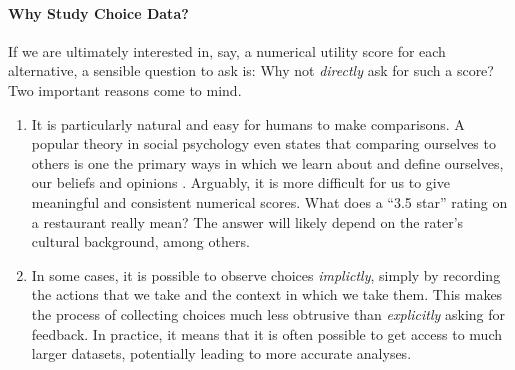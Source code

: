 \paragraph{Why Study Choice Data?}
If we are ultimately interested in, say, a numerical utility score for each alternative, a sensible question to ask is:
Why not \emph{directly} ask for such a score?
Two important reasons come to mind.
\begin{enumerate}
\item It is particularly natural and easy for humans to make comparisons.
A popular theory in social psychology even states that comparing ourselves to others is one the primary ways in which we learn about and define ourselves, our beliefs and opinions \citep{festinger1954theory}.
Arguably, it is more difficult for us to give meaningful and consistent numerical scores.
What does a ``3.5 star'' rating on a restaurant really mean? The answer will likely depend on the rater's cultural background, among others.

\item In some cases, it is possible to observe choices \emph{implictly}, simply by recording the actions that we take and the context in which we take them.
This makes the process of collecting choices much less obtrusive than \emph{explicitly} asking for feedback.
In practice, it means that it is often possible to get access to much larger datasets, potentially leading to more accurate analyses.
\end{enumerate}


